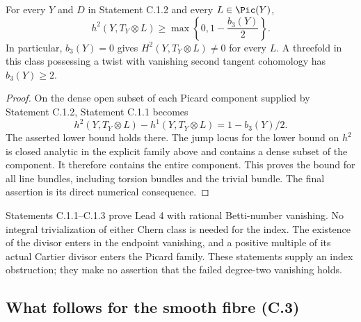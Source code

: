 \begin{corollary}[C.1.3; Proved]\label{st:C.1.3}
For every $Y$ and $D$ in Statement C.1.2 and every $L\in\Pic(Y)$,
\[
 h^2(Y,T_Y\otimes L)\geq
 \max\left\{0,1-\frac{b_3(Y)}2\right\}.
\]
In particular, $b_3(Y)=0$ gives $H^2(Y,T_Y\otimes L)\ne0$ for
every $L$. A threefold in this class possessing a twist with vanishing
second tangent cohomology has $b_3(Y)\geq2$.
\end{corollary}
\begin{proof}
On the dense open subset of each Picard component supplied by
Statement C.1.2, Statement C.1.1 becomes
\[
 h^2(Y,T_Y\otimes L)-h^1(Y,T_Y\otimes L)
 =1-b_3(Y)/2.
\]
The asserted lower bound holds there. The jump locus for the lower
bound on $h^2$ is closed analytic in the explicit family above and
contains a dense subset of the component. It therefore contains the
entire component. This proves the bound for all line bundles,
including torsion bundles and the trivial bundle. The final assertion
is its direct numerical consequence.
\end{proof}

Statements C.1.1--C.1.3 prove Lead 4 with rational Betti-number
vanishing. No integral trivialization of either Chern class is needed
for the index. The existence of the divisor enters in the endpoint
vanishing, and a positive multiple of its actual Cartier divisor
enters the Picard family. These statements supply an index
obstruction; they make no assertion that the failed degree-two
vanishing holds.

\subsection{What follows for the smooth fibre (C.3)}

